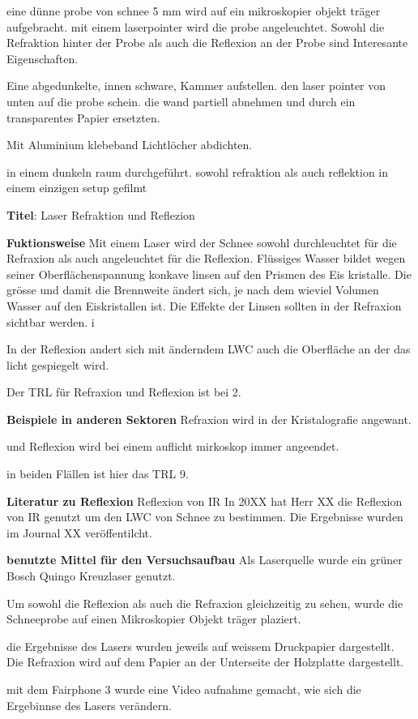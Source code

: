 eine dünne probe von schnee 5 mm wird auf ein mikroskopier objekt träger aufgebracht. mit einem laserpointer wird die probe angeleuchtet. Sowohl die Refraktion hinter der Probe als auch die Reflexion an der Probe sind Interesante Eigenschaften.

Eine abgedunkelte, innen schware, Kammer aufstellen. den laser pointer von unten auf die probe schein. die wand partiell abnehmen und durch ein transparentes Papier ersetzten.

Mit Aluminium klebeband Lichtlöcher abdichten.

in einem dunkeln raum durchgeführt. sowohl refraktion als auch reflektion in einem einzigen setup gefilmt


\textbf{Titel}: Laser Refraktion und Reflezion

\textbf{Fuktionsweise} Mit einem Laser wird der Schnee sowohl durchleuchtet für die Refraxion als auch angeleuchtet für die Reflexion. Flüssiges Wasser bildet wegen seiner Oberflächenspannung konkave linsen auf den Prismen des Eis kristalle. Die grösse und damit die Brennweite ändert sich, je nach dem wieviel Volumen Wasser auf den Eiskristallen ist. Die Effekte der Linsen sollten in der Refraxion sichtbar werden. i

In der Reflexion andert sich mit änderndem LWC auch die Oberfläche an der das licht gespiegelt wird.

Der TRL für Refraxion und Reflexion ist bei 2.

\textbf{Beispiele in anderen Sektoren}
Refraxion wird in der Kristalografie angewant.

und Reflexion wird bei einem auflicht mirkoskop immer angeendet.

in beiden Flällen ist hier das TRL 9.

\textbf{Literatur zu Reflexion}
Reflexion von IR
In 20XX hat Herr XX die Reflexion von IR genutzt um den LWC von Schnee zu bestimmen. Die Ergebnisse wurden im Journal XX veröffentilcht.

\textbf{benutzte Mittel für den Versuchsaufbau}
Als Laserquelle wurde ein grüner Bosch Quingo Kreuzlaser genutzt.

Um sowohl die Reflexion als auch die Refraxion gleichzeitig zu sehen, wurde die Schneeprobe auf einen Mikroskopier Objekt träger plaziert.

die Ergebnisse des Lasers wurden jeweils auf weissem Druckpapier dargestellt. Die Refraxion wird auf dem Papier an der Unterseite der Holzplatte dargestellt.

mit dem Fairphone 3 wurde eine Video aufnahme gemacht, wie sich die Ergebinnse des Lasers verändern.

